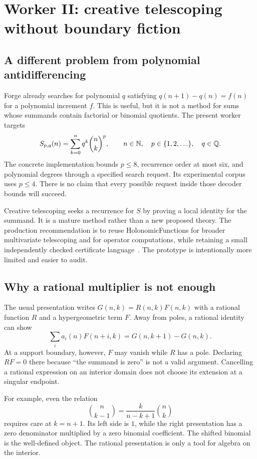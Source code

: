 \section{Worker II: creative telescoping without boundary fiction}
\label{sec:telescoping}

\subsection{A different problem from polynomial antidifferencing}

Forge already searches for polynomial $q$ satisfying $q(n+1)-q(n)=f(n)$ for a
polynomial increment $f$. This is useful, but it is not a method for sums whose
summands contain factorial or binomial quotients. The present worker targets
\begin{equation}\label{eq:sum}
S_{p,q}(n)=\sum_{k=0}^{n}q^k\binom nk^p,
\qquad n\in\mathbb N,\quad p\in\{1,2,\ldots\},\quad q\in\mathbb Q.
\end{equation}
The concrete implementation bounds $p\le8$, recurrence order at most six, and
polynomial degrees through a specified search request. Its experimental corpus
uses $p\le4$. There is no claim that every possible request inside those decoder
bounds will succeed.

Creative telescoping seeks a recurrence for $S$ by proving a local identity for
the summand. It is a mature method rather than a new proposed theory. The
production recommendation is to reuse HolonomicFunctions for broader
multivariate telescoping and  for operator computations,
while retaining a small independently checked certificate language~\cite{holonomic,ore}.
The prototype is intentionally more limited and easier to audit.

\subsection{Why a rational multiplier is not enough}

The usual presentation writes $G(n,k)=R(n,k)F(n,k)$ with a rational function $R$
and a hypergeometric term $F$. Away from poles, a rational identity can show
\[
\sum_i a_i(n)F(n+i,k)=G(n,k+1)-G(n,k).
\]
At a support boundary, however, $F$ may vanish while $R$ has a pole. Declaring
$R F=0$ there because ``the summand is zero'' is not a valid argument. Cancelling
a rational expression on an interior domain does not choose its extension at a
singular endpoint.

For example, even the relation
\[
\binom n{k-1}=\frac{k}{n-k+1}\binom nk
\]
requires care at $k=n+1$. Its left side is $1$, while the right presentation has
a zero denominator multiplied by a zero binomial coefficient. The shifted
binomial is the well-defined object. The rational presentation is only a tool
for algebra on the interior.

